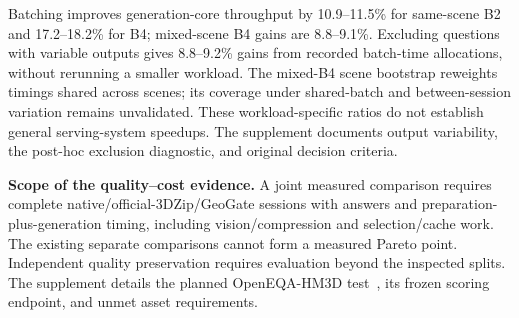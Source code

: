 Batching improves generation-core throughput by 10.9--11.5\% for same-scene B2 and 17.2--18.2\% for B4; mixed-scene B4 gains are 8.8--9.1\%. Excluding questions with variable outputs gives 8.8--9.2\% gains from recorded batch-time allocations, without rerunning a smaller workload. The mixed-B4 scene bootstrap reweights timings shared across scenes; its coverage under shared-batch and between-session variation remains unvalidated. These workload-specific ratios do not establish general serving-system speedups. The supplement documents output variability, the post-hoc exclusion diagnostic, and original decision criteria.

\textbf{Scope of the quality--cost evidence.} A joint measured comparison requires complete native/official-3DZip/GeoGate sessions with answers and preparation-plus-generation timing, including vision/compression and selection/cache work. The existing separate comparisons cannot form a measured Pareto point. Independent quality preservation requires evaluation beyond the inspected splits. The supplement details the planned OpenEQA-HM3D test~\citep{majumdar2024openeqa}, its frozen scoring endpoint, and unmet asset requirements.
